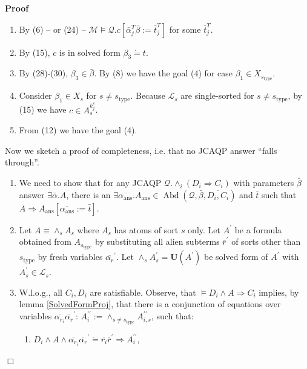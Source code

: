 \documentclass{article}
\newcommand{\assign}{:=}
\newcommand{\tmmathbf}[1]{\ensuremath{\boldsymbol{#1}}}
\newcommand{\tmop}[1]{\ensuremath{\operatorname{#1}}}
\newenvironment{proof}{\noindent\textbf{Proof\ }}{\hspace*{\fill}$\Box$\medskip}
\begin{document}
\begin{proof}
\begin{enumerate}
    \item By (6) -- or (24) -- $\mathcal{M} \vDash \mathcal{Q}.c
    [\bar{\alpha}_j^T \bar{\beta} \assign \bar{t}_j^T]$ for some
    $\bar{t}_j^T$.
    
    \item By (15), $c$ is in solved form $\beta_3 \dot{=} t$.
    
    \item By (28)-(30), $\beta_3 \in \bar{\beta}$. By (8) we have the goal (4)
    for case $\beta_1 \in X_{s_{\tmop{type}}}$.
    
    \item Consider $\beta_1 \in X_s$ for $s \neq s_{\tmop{type}}$. Because
    $\mathcal{L}_s$ are single-sorted for $s \neq s_{\tmop{type}}$, by (15) we
    have $c \in A_s^{k_j^s}$.
    
    \item From (12) we have the goal (4).
  \end{enumerate}
  Now we sketch a proof of completeness, i.e. that no JCAQP answer ``falls
  through''.
  \begin{enumerate}
    \item We need to show that for any JCAQP $\mathcal{Q}. \wedge_i (D_i
    \Rightarrow C_i)$ with parameters $\bar{\beta}$ answer $\exists
    \bar{\alpha} .A$, there is an $\exists \overline{\alpha_{\tmop{ans}}}
    .A_{\tmop{ans}} \in \tmop{Abd} (\mathcal{Q}, \bar{\beta}, \overline{D_i,
    C_i})$ and $\bar{t}$ such that $A \Rightarrow A_{\tmop{ans}}
    [\overline{\alpha_{\tmop{ans}}} \assign \bar{t}]$.
    
    \item Let $A \equiv \wedge_s A_s$ where $A_s$ has atoms of sort $s$ only.
    Let $A^{\prime}$ be a formula obtained from $A_{s_{\tmop{type}}}$ by
    substituting all alien subterms $\bar{r}^{\prime}$ of sorts other than
    $s_{\tmop{type}}$ by fresh variables $\overline{\alpha_r}^{\prime}$. Let
    $\wedge_s A^{\prime}_s =\tmmathbf{U} (A^{\prime})$ be solved form of
    $A^{\prime}$ with $A^{\prime}_s \in \mathcal{L}_s$.
    
    \item W.l.o.g., all $C_i, D_i$ are satisfiable. Observe, that $\vDash D_i
    \wedge A \Rightarrow C_i$ implies, by lemma \ref{SolvedFormProj}, that
    there is a conjunction of equations over variables
    $\overline{\alpha_{r_i}} \overline{\alpha_r}^{\prime}$:
    $A^{\prime\prime}_i \assign \wedge_{s \neq s_{\tmop{type}}} A_{i,
    s}^{\prime\prime}$, such that:
    \begin{enumerate}
      \item  $D_i \wedge A \wedge \overline{\alpha_{r_i}}
      \overline{\alpha_r}^{\prime} \dot{=} \overline{r_i} \bar{r}^{\prime}
      \Rightarrow A^{\prime\prime}_i$,
      

\end{enumerate}
\end{enumerate}
\end{proof}
\end{document}
